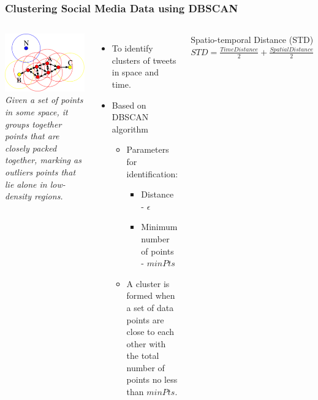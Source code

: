 \begin{frame}
    \frametitle{Clustering Social Media Data using DBSCAN}
    \begin{columns}
             \centering
             \includegraphics[width=\textwidth]{resource/figures/dbscan.png}\\
              \tiny \textit{Given a set of points in some space, it groups together points that are closely packed together, marking as outliers points that lie alone in low-density regions.}
              \begin{itemize}
                  \item To identify clusters of tweets in space and time.
                  \item Based on DBSCAN algorithm
                  \begin{itemize}
                      \item Parameters for identification:
                      \begin{itemize}
                          \item Distance - $\epsilon$
                          \item Minimum number of points - $minPts$
                      \end{itemize}
                      \item A cluster is formed when a set of data points are close to each other with the total number of points no less than $minPts$.
                  \end{itemize}
              \end{itemize}
              \begin{block}{Spatio-temporal Distance (STD)}
                $STD = \frac{TimeDistance}{2} + \frac{SpatialDistance}{2}$
              \end{block}
    \end{columns} 
\end{frame}

